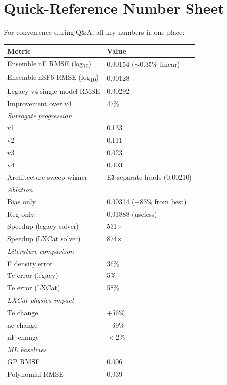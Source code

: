 \documentclass[12pt,a4paper]{article}
\begin{document}
\clearpage

\section*{Quick-Reference Number Sheet}

For convenience during Q\&A, all key numbers in one place:

\begin{center}
\begin{tabular}{l l}
\hline
\textbf{Metric} & \textbf{Value} \\
\hline
Ensemble nF RMSE (log\textsubscript{10}) & 0.00154 ($\sim$0.35\% linear) \\
Ensemble nSF6 RMSE (log\textsubscript{10}) & 0.00128 \\
Legacy v4 single-model RMSE & 0.00292 \\
Improvement over v4 & 47\% \\
\hline
\multicolumn{2}{l}{\emph{Surrogate progression}} \\
v1 & 0.133 \\
v2 & 0.111 \\
v3 & 0.023 \\
v4 & 0.003 \\
\hline
Architecture sweep winner & E3 separate heads (0.00210) \\
\hline
\multicolumn{2}{l}{\emph{Ablation}} \\
Bias only & 0.00314 (+83\% from best) \\
Reg only & 0.01888 (useless) \\
\hline
Speedup (legacy solver) & 531$\times$ \\
Speedup (LXCat solver) & 874$\times$ \\
\hline
\multicolumn{2}{l}{\emph{Literature comparison}} \\
F density error & 36\% \\
Te error (legacy) & 5\% \\
Te error (LXCat) & 58\% \\
\hline
\multicolumn{2}{l}{\emph{LXCat physics impact}} \\
Te change & +56\% \\
ne change & $-$69\% \\
nF change & $<$2\% \\
\hline
\multicolumn{2}{l}{\emph{ML baselines}} \\
GP RMSE & 0.006 \\
Polynomial RMSE & 0.039 \\

\end{tabular}
\end{center}
\end{document}
